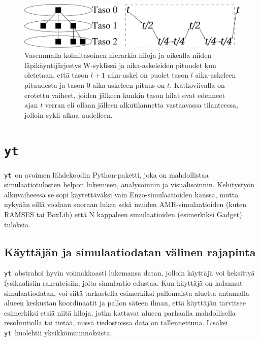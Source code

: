 \documentclass[12pt,a4paper]{article}
\newcommand{\yt}{\texttt{yt}}
\begin{document}
\begin{figure}
   \centering
   \includegraphics[width=\textwidth]{../kuvat/W-cycle.png}
   \caption{Vasemmalla kolmitasoinen hierarkia hiloja ja oikealla niiden läpikäyntijärjestys W-syklissä ja aika-askeleiden pituudet kun oletetaan, että tason $l+1$ aika-askel on puolet tason $l$ aika-askeleen pituudesta ja tason $0$ aika-askeleen pituus on $t$. Katkoviivalla on erotettu vaiheet, joiden jälkeen kunkin tason hilat ovat edenneet ajan $t$ verran eli ollaan jälleen alkutilannetta vastaavassa tilanteessa, jolloin sykli alkaa uudelleen.}\label{fig:w-cycle} %
\end{figure}




\section{\yt}
\yt\ on avoimen lähdekoodin Python-paketti, joka on mahdollistaa simulaatiotulosten helpon lukemisen, analysoinnin ja visualisoinnin. Kehitystyön alkuvaiheessa se sopi käytettä\-väksi vain Enzo-simulaatioiden kanssa, mutta nykyään sillä voidaan suoraan lukea sekä muiden AMR-simulaatioiden (kuten RAMSES tai BoxLib) että N kappaleen simulaatioiden (esimerkiksi Gadget) tuloksia. \cite{yt}

\subsection{Käyttäjän ja simulaatiodatan välinen rajapinta}
\yt\ abstrahoi hyvin voimakkaasti lukemansa datan, jolloin käyttäjä voi keksittyä fysikaalisiin rakenteisiin, joita simulaatio edustaa. Kun käyttäjä on ladannut simulaatiodatan, voi siitä tarkastella esimerkiksi pallomaista aluetta antamalla alueen keskustan koordinaatit ja pallon säteen ilman, että käyttäjän tarvitsee esimerkiksi etsiä niitä hiloja, jotka kattavat alueen parhaalla mahdollisella resoluutiolla tai tietää, missä tiedostoissa data on tallennettuna. Lisäksi \yt\ huolehtii yksikkömuunnoksista. \cite{yt}
\end{document}
